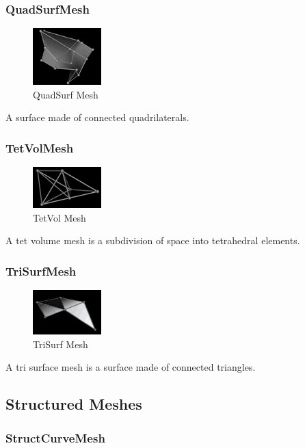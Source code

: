 \documentclass[fleqn,12pt,openany]{book}
\begin{document}
\subsubsection{QuadSurfMesh}
\begin{figure}[H]\label{quadsurfmesh}
\includegraphics{UserGuide_figures/QuadSurf.png}
\caption{QuadSurf Mesh}
\end{figure}

A surface made of connected quadrilaterals.

\subsubsection{TetVolMesh}
\begin{figure}[H]\label{tetvolmesh}
\includegraphics{UserGuide_figures/TetVol.png}
\caption{TetVol Mesh}
\end{figure}

A tet volume mesh is a subdivision of space into tetrahedral elements.

\subsubsection{TriSurfMesh}
\begin{figure}[H]\label{trisurfmesh}
\includegraphics{UserGuide_figures/TriSurf.png}
\caption{TriSurf Mesh}
\end{figure}

A tri surface mesh is a surface made of connected triangles.

\subsection{Structured Meshes}

\subsubsection{StructCurveMesh}
\end{document}
